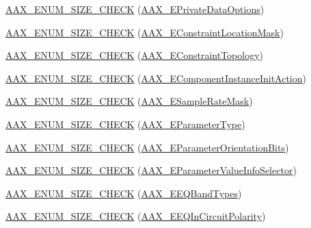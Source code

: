 \begin{DoxyCompactItemize}
\item 
\mbox{\hyperlink{a00491_a1639885b25e8435d1db62b0cd22b86ad}{A\+A\+X\+\_\+\+E\+N\+U\+M\+\_\+\+S\+I\+Z\+E\+\_\+\+C\+H\+E\+CK}} (\mbox{\hyperlink{a00491_a9f1ef2cb64daf30eaf145dfbb8cd0d00}{A\+A\+X\+\_\+\+E\+Private\+Data\+Options}})
\item 
\mbox{\hyperlink{a00491_a2ff5fb83d7debdbae7b3649bf560740c}{A\+A\+X\+\_\+\+E\+N\+U\+M\+\_\+\+S\+I\+Z\+E\+\_\+\+C\+H\+E\+CK}} (\mbox{\hyperlink{a00491_a0c5d795c1fd021c5b9b541febc34601a}{A\+A\+X\+\_\+\+E\+Constraint\+Location\+Mask}})
\item 
\mbox{\hyperlink{a00491_a05ccc55cd7c2955a742a5fd17ee00156}{A\+A\+X\+\_\+\+E\+N\+U\+M\+\_\+\+S\+I\+Z\+E\+\_\+\+C\+H\+E\+CK}} (\mbox{\hyperlink{a00491_a714f56a9b0ab98a3a5365760adf77624}{A\+A\+X\+\_\+\+E\+Constraint\+Topology}})
\item 
\mbox{\hyperlink{a00491_a4f9ac7c5d47f389146081919b8f3e325}{A\+A\+X\+\_\+\+E\+N\+U\+M\+\_\+\+S\+I\+Z\+E\+\_\+\+C\+H\+E\+CK}} (\mbox{\hyperlink{a00491_aff5646376a3c93f032cf2400e0885023}{A\+A\+X\+\_\+\+E\+Component\+Instance\+Init\+Action}})
\item 
\mbox{\hyperlink{a00491_a0bed981d3c56de4cd94ea79013fbe173}{A\+A\+X\+\_\+\+E\+N\+U\+M\+\_\+\+S\+I\+Z\+E\+\_\+\+C\+H\+E\+CK}} (\mbox{\hyperlink{a00491_a5bb98259de21d2c4d04a2d6010d757c7}{A\+A\+X\+\_\+\+E\+Sample\+Rate\+Mask}})
\item 
\mbox{\hyperlink{a00491_aca817380286bce284343e38d3757ec30}{A\+A\+X\+\_\+\+E\+N\+U\+M\+\_\+\+S\+I\+Z\+E\+\_\+\+C\+H\+E\+CK}} (\mbox{\hyperlink{a00491_a4cd0f189daa9a60cf36883c56344bb2e}{A\+A\+X\+\_\+\+E\+Parameter\+Type}})
\item 
\mbox{\hyperlink{a00491_a8354d2be741861f15c2553345a9d33bf}{A\+A\+X\+\_\+\+E\+N\+U\+M\+\_\+\+S\+I\+Z\+E\+\_\+\+C\+H\+E\+CK}} (\mbox{\hyperlink{a00491_aa5ffa1ed828630b6b7a13c049d93ae87}{A\+A\+X\+\_\+\+E\+Parameter\+Orientation\+Bits}})
\item 
\mbox{\hyperlink{a00491_ac2d84d9b4dbf8606eb764cb643b1aa97}{A\+A\+X\+\_\+\+E\+N\+U\+M\+\_\+\+S\+I\+Z\+E\+\_\+\+C\+H\+E\+CK}} (\mbox{\hyperlink{a00491_aa169208a2ce713fa021e20deb2eaf608}{A\+A\+X\+\_\+\+E\+Parameter\+Value\+Info\+Selector}})
\item 
\mbox{\hyperlink{a00491_a092e4083784be1310fd77288d9667c0b}{A\+A\+X\+\_\+\+E\+N\+U\+M\+\_\+\+S\+I\+Z\+E\+\_\+\+C\+H\+E\+CK}} (\mbox{\hyperlink{a00491_a9ec6da28e827496514bd15d6f2b26d95}{A\+A\+X\+\_\+\+E\+E\+Q\+Band\+Types}})
\item 
\mbox{\hyperlink{a00491_a86e29bfb97bc412a8cc646a33bee5820}{A\+A\+X\+\_\+\+E\+N\+U\+M\+\_\+\+S\+I\+Z\+E\+\_\+\+C\+H\+E\+CK}} (\mbox{\hyperlink{a00491_ab5bda96f09874705e9b800d1b1495b48}{A\+A\+X\+\_\+\+E\+E\+Q\+In\+Circuit\+Polarity}})

\end{DoxyCompactItemize}

